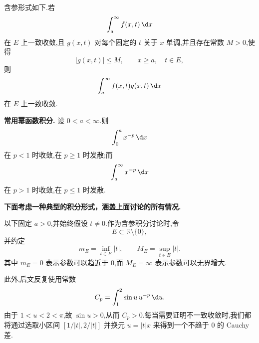 含参形式如下.若
\begin{equation*}
	\int_a^\infty f(x,t)\,\d x
\end{equation*}
在 $E$ 上一致收敛,且 $g(x,t)$ 对每个固定的 $t$ 关于 $x$ 单调,并且存在常数 $M>0$,使得
\begin{equation*}
	|g(x,t)|\leq M,
	\qquad x\geq a,
	\quad t\in E,
\end{equation*}
则
\begin{equation*}
	\int_a^\infty f(x,t)g(x,t)\,\d x
\end{equation*}
在 $E$ 上一致收敛.

\textbf{常用幂函数积分.}
设 $0<a<\infty$.则
\begin{equation*}
	\int_0^a x^{-p}\,\d x
\end{equation*}
在 $p<1$ 时收敛,在 $p\geq1$ 时发散;而
\begin{equation*}
	\int_a^\infty x^{-p}\,\d x
\end{equation*}
在 $p>1$ 时收敛,在 $p\leq1$ 时发散.

\textbf{下面考虑一种典型的积分形式，涵盖上面讨论的所有情况.}

以下固定 $a>0$,并始终假设 $t\neq0$.作为含参积分讨论时,令
\begin{equation*}
	E\subset\mathbb R\setminus\{0\},
\end{equation*}
并约定
\begin{equation*}
	m_E=\inf_{t\in E}|t|,
	\qquad
	M_E=\sup_{t\in E}|t|.
\end{equation*}
其中 $m_E=0$ 表示参数可以趋近于 $0$,而 $M_E=\infty$ 表示参数可以无界增大.

此外,后文反复使用常数
\begin{equation*}
	C_p=\int_1^2\sin u\,u^{-p}\,\d u.
\end{equation*}
由于 $1<u<2<\pi$,故 $\sin u>0$,从而 $C_p>0$.每当需要证明不一致收敛时,我们都将通过选取小区间 $[1/|t|,2/|t|]$ 并换元 $u=|t|x$ 来得到一个不趋于 $0$ 的 Cauchy 差.

